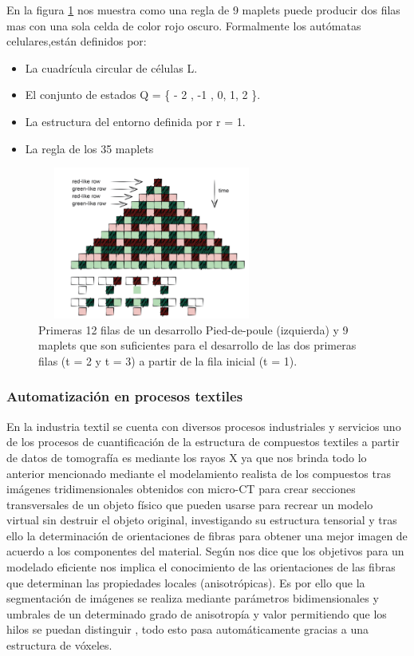 \documentclass[10pt,conference]{IEEEtran}
\begin{document}
En la figura \ref{Textil2} nos muestra como una regla de 9 maplets puede producir dos filas mas con una sola celda de color rojo oscuro. 
Formalmente los autómatas celulares,están definidos por:
\begin{itemize}
\item  La cuadrícula circular de células L.
\item  El conjunto de estados  Q = \{ - 2 , -1 , 0, 1, 2 \}.
\item  La estructura del entorno definida por r = 1.
\item  La regla de los 35 maplets
\end{itemize}

\begin{figure}[H]
    \centering
    \includegraphics[width=7.5cm, height=5cm]{Ind. Tetxil/text2.PNG}
    \caption{Primeras 12 filas de un desarrollo Pied-de-poule (izquierda) y 9 maplets que son suficientes para el desarrollo de las dos primeras filas (t = 2 y t = 3) a partir de la fila inicial (t = 1).}
    \label{Textil2} 
    \end{figure}
\subsubsection{\textbf{Automatización en procesos textiles}}
En la industria textil se cuenta con diversos procesos industriales y servicios uno de los procesos de cuantificación de la estructura de compuestos textiles a partir de datos de tomografía es mediante los rayos X ya que nos brinda todo lo anterior mencionado mediante el modelamiento realista de los compuestos tras imágenes tridimensionales obtenidos con micro-CT para crear secciones transversales de un objeto físico que pueden usarse para recrear un modelo virtual sin destruir el objeto original, investigando su estructura tensorial y tras ello la determinación de orientaciones de fibras para obtener una mejor imagen de acuerdo a los componentes del material.
Según  nos dice que los objetivos para un modelado eficiente nos implica el conocimiento de las orientaciones de las fibras que determinan las propiedades locales (anisotrópicas). Es por ello que la segmentación de imágenes se realiza mediante parámetros bidimensionales y umbrales de un determinado grado de anisotropía y valor permitiendo que los hilos se puedan distinguir , todo esto pasa automáticamente gracias a una estructura de vóxeles.
\end{document}
